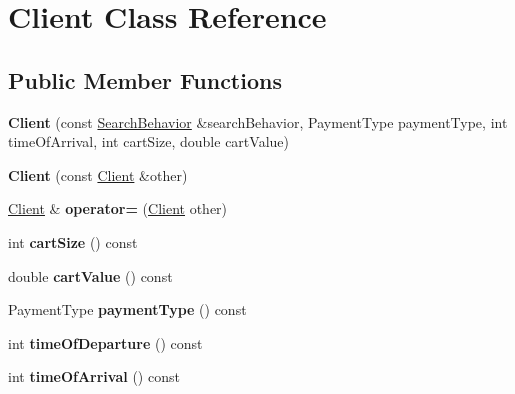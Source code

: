 \hypertarget{classClient}{\section{Client Class Reference}
\label{classClient}
}
\subsection*{Public Member Functions}
\begin{DoxyCompactItemize}
\item 
\hypertarget{classClient_a3b5a8f683ebd0abdf91b8cfe4c8be817}{{\bfseries Client} (const \hyperlink{classSearchBehavior}{Search\-Behavior} \&search\-Behavior, Payment\-Type payment\-Type, int time\-Of\-Arrival, int cart\-Size, double cart\-Value)}\label{classClient_a3b5a8f683ebd0abdf91b8cfe4c8be817}

\item 
\hypertarget{classClient_a4d8e3b9fdfa24b7586bcf24537b89b67}{{\bfseries Client} (const \hyperlink{classClient}{Client} \&other)}\label{classClient_a4d8e3b9fdfa24b7586bcf24537b89b67}

\item 
\hypertarget{classClient_acc35776f6a75d2fb8d4abfb3cc33f8a3}{\hyperlink{classClient}{Client} \& {\bfseries operator=} (\hyperlink{classClient}{Client} other)}\label{classClient_acc35776f6a75d2fb8d4abfb3cc33f8a3}

\item 
\hypertarget{classClient_a2ef5728c74cc7f9dfce8b5e9e950427c}{int {\bfseries cart\-Size} () const }\label{classClient_a2ef5728c74cc7f9dfce8b5e9e950427c}

\item 
\hypertarget{classClient_a52b9e8ce7f11c440fb532f6056db5fe2}{double {\bfseries cart\-Value} () const }\label{classClient_a52b9e8ce7f11c440fb532f6056db5fe2}

\item 
\hypertarget{classClient_a9cceb950fc9c53ea35bcddf6214e4e4f}{Payment\-Type {\bfseries payment\-Type} () const }\label{classClient_a9cceb950fc9c53ea35bcddf6214e4e4f}

\item 
\hypertarget{classClient_ae56c063a8bc1c57e9c47ad88b1770994}{int {\bfseries time\-Of\-Departure} () const }\label{classClient_ae56c063a8bc1c57e9c47ad88b1770994}

\item 
\hypertarget{classClient_af327f525b4cf7838d97c095c8dd00e60}{int {\bfseries time\-Of\-Arrival} () const }\label{classClient_af327f525b4cf7838d97c095c8dd00e60}


\end{DoxyCompactItemize}
